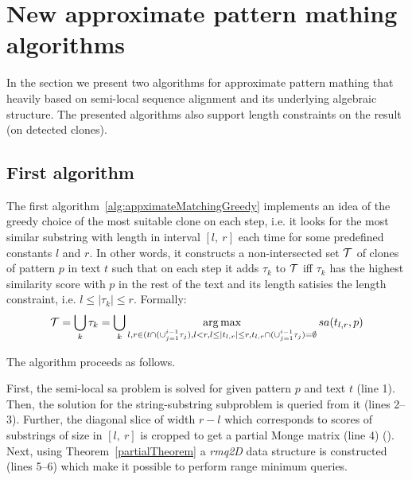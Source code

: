 \section{New approximate pattern mathing algorithms}
\label{section:our}

In the section we present two algorithms for approximate pattern mathing that heavily based on semi-local sequence alignment and its underlying algebraic structure.
The presented algorithms also support length constraints on the result (on detected clones).

\subsection{First algorithm}
The first algorithm~\ref{alg:appximateMatchingGreedy} implements an idea of the greedy choice of the most suitable clone on each step, i.e. it looks for the most similar substring with length in interval $[l,\ r]$ each time for some predefined constants $l$ and $r$.
In other words, it constructs a non-intersected set ${\mathcal{T}}$ of clones of pattern $p$ in text $t$ such that on each step it adds $\tau_k$ to ${\mathcal{T}}$ iff $\tau_k$ has the highest similarity score with $p$ in the rest of the text and its length satisies the length constraint, i.e. $l \leq |\tau_k| \leq r$.
Formally:
\begin{equation}
   {\mathcal{T}} = \bigcup_{k} \tau_k = \bigcup_k \operatorname*{arg\,max}_{l,r \in (t \cap (\cup_{j=1}^{i-1} \tau_{j}),l<r, l \leq |t_{l,r}| \leq r ,t_{l,r} \cap (\cup_{j=1}^{i-1} \tau_{j}) = \emptyset } sa(t_{l,r}, p)
\end{equation}

The algorithm proceeds as follows.

First, the semi-local sa problem is solved for given pattern $p$ and text $t$ (line 1).
Then, the solution for the string-substring subproblem is queried from it (lines 2--3).
Further, the diagonal slice of width $r-l$ which corresponds to scores of substrings of size in $[l,\ r]$ is cropped to get a partial Monge matrix (line 4) ().
Next, using Theorem~\ref{partialTheorem} a \emph{rmq2D} data structure is constructed (lines 5--6) which make it possible to perform range minimum queries.


